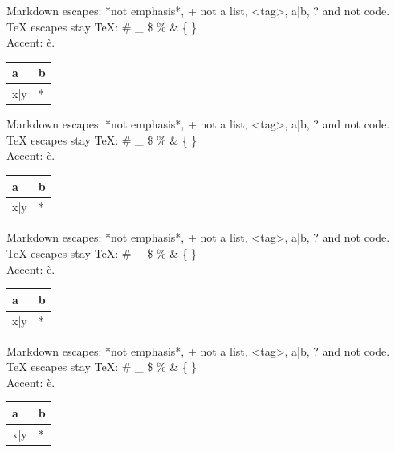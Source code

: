 Markdown escapes: *not emphasis*, + not a list, <tag>, a|b, ? and \textasciigrave{}not code\textasciigrave{}.
TeX escapes stay TeX: \# \_ \$ \% \& \{ \} \- \\
Accent: \`{e}.

\par\addvspace{\medskipamount}
\noindent\begin{tabularx}{\linewidth}{@{}>{\raggedright\arraybackslash}X>{\raggedright\arraybackslash}X@{}}
\toprule
a & b \\
\midrule
x|y & * \\
\bottomrule
\end{tabularx}
\par\addvspace{\medskipamount}
Markdown escapes: *not emphasis*, + not a list, <tag>, a|b, ? and \textasciigrave{}not code\textasciigrave{}.
TeX escapes stay TeX: \# \_ \$ \% \& \{ \} \- \\
Accent: \`{e}.

\par\addvspace{\medskipamount}
\noindent\begin{tabularx}{\linewidth}{@{}>{\raggedright\arraybackslash}X>{\raggedright\arraybackslash}X@{}}
\toprule
a & b \\
\midrule
x|y & * \\
\bottomrule
\end{tabularx}
\par\addvspace{\medskipamount}
Markdown escapes: *not emphasis*, + not a list, <tag>, a|b, ? and \textasciigrave{}not code\textasciigrave{}.
TeX escapes stay TeX: \# \_ \$ \% \& \{ \} \- \\
Accent: \`{e}.

\par\addvspace{\medskipamount}
\noindent\begin{tabularx}{\linewidth}{@{}>{\raggedright\arraybackslash}X>{\raggedright\arraybackslash}X@{}}
\toprule
a & b \\
\midrule
x|y & * \\
\bottomrule
\end{tabularx}
\par\addvspace{\medskipamount}
\begin{frame}[t]
Markdown escapes: *not emphasis*, + not a list, <tag>, a|b, ? and \textasciigrave{}not code\textasciigrave{}.
TeX escapes stay TeX: \# \_ \$ \% \& \{ \} \- \\
Accent: \`{e}.

\par\addvspace{\medskipamount}
\noindent\begin{tabularx}{\linewidth}{@{}>{\raggedright\arraybackslash}X>{\raggedright\arraybackslash}X@{}}
\toprule
a & b \\
\midrule
x|y & * \\
\bottomrule
\end{tabularx}
\par\addvspace{\medskipamount}
\end{frame}

